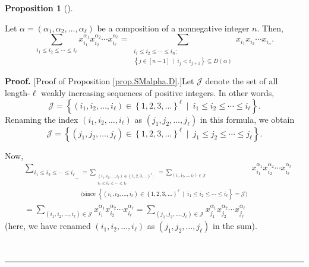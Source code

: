 \documentclass[numbers=enddot,12pt,final,onecolumn,notitlepage,abstracton]{scrartcl}
\theoremstyle{definition}
\newtheorem{prop}[theo]{Proposition}
\newenvironment{proposition}[1][]
{\begin{prop}[#1]\begin{leftbar}}
{\end{leftbar}\end{prop}}
\newenvironment{proof}[1][Proof]{\noindent\textbf{#1.} }{\ \rule{0.5em}{0.5em}}
\let\sumnonlimits\sum
\renewcommand{\sum}{\sumnonlimits\limits}
\newenvironment{verlong}{}{}
\begin{document}
\begin{verlong}
\begin{footnotesize}
\begin{proposition}
\label{prop.SMalpha.D}Let $\alpha=\left(  \alpha_{1},\alpha_{2},\ldots
,\alpha_{\ell}\right)  $ be a composition of a nonnegative integer $n$. Then,%
\[
\sum_{i_{1}\leq i_{2}\leq\cdots\leq i_{\ell}}x_{i_{1}}^{\alpha_{1}}x_{i_{2}%
}^{\alpha_{2}}\cdots x_{i_{\ell}}^{\alpha_{\ell}}=\sum_{\substack{i_{1}\leq
i_{2}\leq\cdots\leq i_{n};\\\left\{  j\in\left[  n-1\right]  \ \mid
\ i_{j}<i_{j+1}\right\}  \subseteq D\left(  \alpha\right)  }}x_{i_{1}}%
x_{i_{2}}\cdots x_{i_{n}}.
\]

\end{proposition}

\begin{proof}
[Proof of Proposition \ref{prop.SMalpha.D}.]Let $\mathcal{J}$ denote the set
of all length-$\ell$ weakly increasing sequences of positive integers. In
other words,%
\begin{equation}
\mathcal{J}=\left\{  \left(  i_{1},i_{2},\ldots,i_{\ell}\right)  \in\left\{
1,2,3,\ldots\right\}  ^{\ell}\ \mid\ i_{1}\leq i_{2}\leq\cdots\leq i_{\ell
}\right\}  . \label{pf.prop.SMalpha.D.J=}%
\end{equation}
Renaming the index $\left(  i_{1},i_{2},\ldots,i_{\ell}\right)  $ as $\left(
j_{1},j_{2},\ldots,j_{\ell}\right)  $ in this formula, we obtain%
\[
\mathcal{J}=\left\{  \left(  j_{1},j_{2},\ldots,j_{\ell}\right)  \in\left\{
1,2,3,\ldots\right\}  ^{\ell}\ \mid\ j_{1}\leq j_{2}\leq\cdots\leq j_{\ell
}\right\}  .
\]


Now,%
\begin{align}
&  \underbrace{\sum_{i_{1}\leq i_{2}\leq\cdots\leq i_{\ell}}}_{\substack{=\sum
_{\substack{\left(  i_{1},i_{2},\ldots,i_{\ell}\right)  \in\left\{
1,2,3,\ldots\right\}  ^{\ell};\\i_{1}\leq i_{2}\leq\cdots\leq i_{\ell}}%
}=\sum_{\left(  i_{1},i_{2},\ldots,i_{\ell}\right)  \in\mathcal{J}%
}\\\text{(since }\left\{  \left(  i_{1},i_{2},\ldots,i_{\ell}\right)
\in\left\{  1,2,3,\ldots\right\}  ^{\ell}\ \mid\ i_{1}\leq i_{2}\leq\cdots\leq
i_{\ell}\right\}  =\mathcal{J}\text{)}}}x_{i_{1}}^{\alpha_{1}}x_{i_{2}%
}^{\alpha_{2}}\cdots x_{i_{\ell}}^{\alpha_{\ell}}\nonumber\\
&  =\sum_{\left(  i_{1},i_{2},\ldots,i_{\ell}\right)  \in\mathcal{J}}x_{i_{1}%
}^{\alpha_{1}}x_{i_{2}}^{\alpha_{2}}\cdots x_{i_{\ell}}^{\alpha_{\ell}}%
=\sum_{\left(  j_{1},j_{2},\ldots,j_{\ell}\right)  \in\mathcal{J}}x_{j_{1}%
}^{\alpha_{1}}x_{j_{2}}^{\alpha_{2}}\cdots x_{j_{\ell}}^{\alpha_{\ell}}
\label{pf.prop.SMalpha.D.Malpha=}%
\end{align}
(here, we have renamed $\left(  i_{1},i_{2},\ldots,i_{\ell}\right)  $ as
$\left(  j_{1},j_{2},\ldots,j_{\ell}\right)  $ in the sum).


\end{proof}
\end{footnotesize}
\end{verlong}
\end{document}
